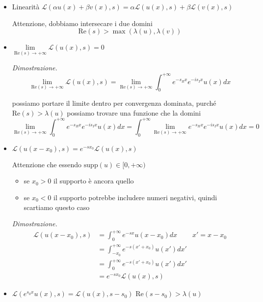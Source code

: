 \begin{itemize}
\item Linearità $\boxed{\mathcal{L}( \alpha u( x) +\beta v( x) ,s) =\alpha \mathcal{L}( u( x) ,s) +\beta \mathcal{L}( v( x) ,s)}$

Attenzione, dobbiamo intersecare i due domini\begin{equation*}
\boxed{\mathrm{Re}( s)  >\max( \lambda ( u) ,\lambda ( v))}
\end{equation*}
\item $\boxed{\lim\limits _{\mathrm{Re}( s)\rightarrow +\infty }\mathcal{L}( u( x) ,s) =0}$

\textit{Dimostrazione.}\begin{equation*}
\lim\limits _{\mathrm{Re}( s)\rightarrow +\infty }\mathcal{L}( u( x) ,s) =\lim\limits _{\mathrm{Re}( s)\rightarrow +\infty }\int ^{+\infty }_{0} e^{-s_{R} x} e^{-is_{I} x} u( x) dx
\end{equation*}

possiamo portare il limite dentro per convergenza dominata, purché $\mathrm{Re}( s)  >\lambda ( u)$ possiamo trovare una funzione che la domini\begin{equation*}
\lim\limits _{\mathrm{Re}( s)\rightarrow +\infty }\int ^{+\infty }_{0} e^{-s_{R} x} e^{-is_{I} x} u( x) dx=\int ^{+\infty }_{0}\lim\limits _{\mathrm{Re}( s)\rightarrow +\infty } e^{-s_{R} x} e^{-is_{I} x} u( x) dx=0
\end{equation*}
\item $\boxed{\mathcal{L}( u( x-x_{0}) ,s) =e^{-sx_{0}}\mathcal{L}( u( x) ,s)}$

Attenzione che essendo $\mathrm{supp}( u) \in [ 0,+\infty )$
\begin{itemize}
\item se $\boxed{x_{0}  >0}$ il supporto è ancora quello
\item se $x_{0} < 0$ il supporto potrebbe includere numeri negativi, quindi scartiamo questo caso
\end{itemize}

\textit{Dimostrazione.}\begin{equation*}
\begin{aligned}
\mathcal{L}( u( x-x_{0}) ,s) & =\int ^{+\infty }_{0} e^{-sx} u( x-x_{0}) dx & x'=x-x_{0}\\
 & =\int ^{+\infty }_{-x_{0}} e^{-s( x'+x_{0})} u( x') dx' & \\
 & =\int ^{+\infty }_{0} e^{-s( x'+x_{0})} u( x') dx' & \\
 & =e^{-sx_{0}}\mathcal{L}( u( x) ,s) & 
\end{aligned}
\end{equation*}
\item $\boxed{\mathcal{L}\left( e^{s_{0} x} u( x) ,s\right) =\mathcal{L}( u( x) ,s-s_{0})}$ $\boxed{\mathrm{Re}( s-s_{0})  >\lambda ( u)}$


\end{itemize}

